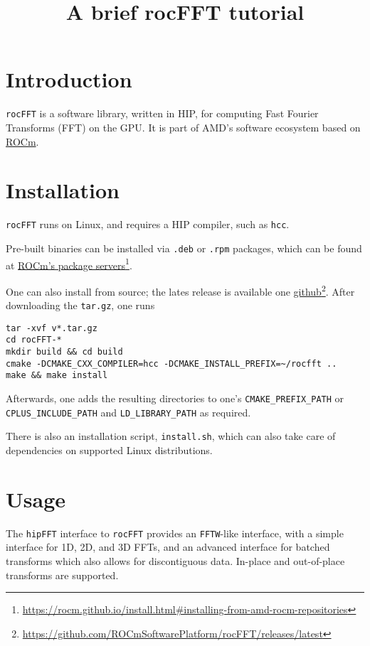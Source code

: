 \documentclass[12pt]{article}
\title{A brief rocFFT tutorial}
\date{}
\renewcommand{\(}{\left(}
\renewcommand{\)}{\right)}
\begin{document}
\maketitle

\section{Introduction}

\texttt{rocFFT} is a software library, written in HIP, for computing
Fast Fourier Transforms (FFT) on the GPU. It is part of AMD's software
ecosystem based on \href{https://github.com/RadeonOpenCompute}{ROCm}.

\section{Installation}

\texttt{rocFFT} runs on Linux, and requires a HIP compiler, such as
\texttt{hcc}.

Pre-built binaries can be installed via \texttt{.deb} or \texttt{.rpm}
packages, which can be found at
\href{https://rocm.github.io/install.html#installing-from-amd-rocm-repositories}{ROCm's
  package servers}\footnote{\url{https://rocm.github.io/install.html\#installing-from-amd-rocm-repositories}}.

One can also install from source; the lates release is available one
\href{https://github.com/ROCmSoftwarePlatform/rocFFT/releases/latest}{github}\footnote{\url{https://github.com/ROCmSoftwarePlatform/rocFFT/releases/latest}}.
After downloading the \texttt{tar.gz}, one runs
\begin{verbatim}
tar -xvf v*.tar.gz
cd rocFFT-*
mkdir build && cd build
cmake -DCMAKE_CXX_COMPILER=hcc -DCMAKE_INSTALL_PREFIX=~/rocfft ..
make && make install
\end{verbatim}
Afterwards, one adds the resulting directories to one's
\texttt{CMAKE_PREFIX_PATH} or \texttt{CPLUS_INCLUDE_PATH} and
\texttt{LD_LIBRARY_PATH} as required.

There is also an installation script, \texttt{install.sh}, which can
also take care of dependencies on supported Linux distributions.

\section{Usage}

The \texttt{hipFFT} interface to \texttt{rocFFT} provides an
\texttt{FFTW}-like interface, with a simple interface for 1D, 2D, and
3D FFTs, and an advanced interface for batched transforms which also
allows for discontiguous data.  In-place and out-of-place transforms
are supported.
\end{document}
